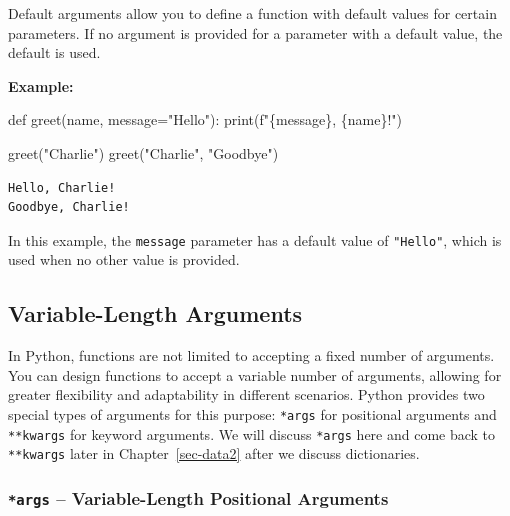 \documentclass[
  letterpaper,
  DIV=11,
  numbers=noendperiod]{scrreprt}
\newenvironment{Shaded}{\begin{snugshade}}{\end{snugshade}}
\newcommand{\BuiltInTok}[1]{\textcolor[rgb]{0.00,0.23,0.31}{#1}}
\newcommand{\KeywordTok}[1]{\textcolor[rgb]{0.00,0.23,0.31}{#1}}
\newcommand{\NormalTok}[1]{\textcolor[rgb]{0.00,0.23,0.31}{#1}}
\newcommand{\OperatorTok}[1]{\textcolor[rgb]{0.37,0.37,0.37}{#1}}
\newcommand{\SpecialCharTok}[1]{\textcolor[rgb]{0.37,0.37,0.37}{#1}}
\newcommand{\SpecialStringTok}[1]{\textcolor[rgb]{0.13,0.47,0.30}{#1}}
\newcommand{\StringTok}[1]{\textcolor[rgb]{0.13,0.47,0.30}{#1}}
\begin{document}
Default arguments allow you to define a function with default values for
certain parameters. If no argument is provided for a parameter with a
default value, the default is used.

\textbf{Example:}

\begin{Shaded}
\begin{Highlighting}[]
\KeywordTok{def}\NormalTok{ greet(name, message}\OperatorTok{=}\StringTok{"Hello"}\NormalTok{):}
    \BuiltInTok{print}\NormalTok{(}\SpecialStringTok{f"}\SpecialCharTok{\{}\NormalTok{message}\SpecialCharTok{\}}\SpecialStringTok{, }\SpecialCharTok{\{}\NormalTok{name}\SpecialCharTok{\}}\SpecialStringTok{!"}\NormalTok{)}

\NormalTok{greet(}\StringTok{"Charlie"}\NormalTok{)  }
\NormalTok{greet(}\StringTok{"Charlie"}\NormalTok{, }\StringTok{"Goodbye"}\NormalTok{) }
\end{Highlighting}
\end{Shaded}

\begin{verbatim}
Hello, Charlie!
Goodbye, Charlie!
\end{verbatim}

In this example, the \texttt{message} parameter has a default value of
\texttt{"Hello"}, which is used when no other value is provided.

\hypertarget{sec-functions_kargs}{%
\subsection{Variable-Length Arguments}\label{sec-functions_kargs}}

In Python, functions are not limited to accepting a fixed number of
arguments. You can design functions to accept a variable number of
arguments, allowing for greater flexibility and adaptability in
different scenarios. Python provides two special types of arguments for
this purpose: \texttt{*args} for positional arguments and
\texttt{**kwargs} for keyword arguments. We will discuss \texttt{*args}
here and come back to \texttt{**kwargs} later in Chapter~\ref{sec-data2}
after we discuss dictionaries.

\hypertarget{args-variable-length-positional-arguments}{%
\subsubsection{\texorpdfstring{\texttt{*args} -- Variable-Length
Positional
Arguments}{*args -- Variable-Length Positional Arguments}}\label{args-variable-length-positional-arguments}}
\end{document}
